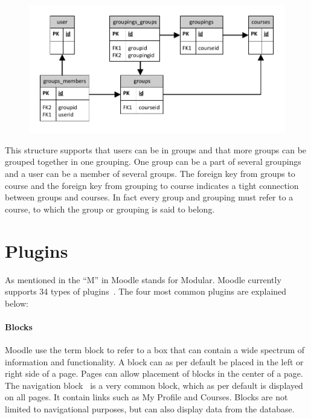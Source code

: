 \begin{figure}
	\centering
		\includegraphics[width=\textwidth]{images/moodlegroups}
	\label{fig:moodlegroupsandgroupings}
\end{figure}

This structure supports that users can be in groups and that more groups can be grouped together in one grouping. 
One group can be a part of several groupings and a user can be a member of several groups. 
The foreign key from groups to course and the foreign key from grouping to course indicates a tight connection between groups and courses.
In fact every group and grouping must refer to a course, to which the group or grouping is said to belong.

\section{Plugins}
\label{sub:plugins}
As mentioned in  the ``M'' in Moodle stands for Modular. 
Moodle currently supports 34 types of plugins~\cite{plugin}.
The four most common plugins are explained below:




\paragraph{Blocks}
\label{subsec:blocks}
Moodle use the term block to refer to a box that can contain a wide spectrum of information and functionality.
A block can as per default be placed in the left or right side of a page. 
Pages can allow placement of blocks in the center of a page.
The navigation block~\cite{navigationblock} is a very common block, which as per default is displayed on all pages. 
It contain links such as My Profile and Courses. 
Blocks are not limited to navigational purposes, but can also display data from the database.


